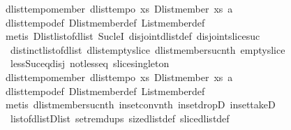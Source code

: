 \begin{isabellebody}
\isanewline
%
\endisadelimproof
\isanewline
{}\isamarkupfalse%
\ dlist{\isacharunderscore}tempo{}{\isacharunderscore}member{\isacharcolon}\ {\isachardoublequoteopen}dlist{\isacharunderscore}tempo{}\ {\isacharparenleft}{\isasymlambda}xs{\isachardot}\ Dlist{\isachardot}member\ xs\ a{\isacharparenright}{\isachardoublequoteclose}\isanewline
%
\isadelimproof
%
\endisadelimproof
%
\isatagproof
{}\isamarkupfalse%
\ dlist{\isacharunderscore}tempo{}{\isacharunderscore}def\ Dlist{\isachardot}member{\isacharunderscore}def\ List{\isachardot}member{\isacharunderscore}def\isanewline
{}\isamarkupfalse%
\ {\isacharparenleft}metis\ Dlist{\isacharunderscore}list{\isacharunderscore}of{\isacharunderscore}dlist\ Suc{\isacharunderscore}leI\ disjoint{\isacharunderscore}dlist{\isacharunderscore}def\ disjoint{\isacharunderscore}slice{\isacharunderscore}suc\ \isanewline
\ \ distinct{\isacharunderscore}list{\isacharunderscore}of{\isacharunderscore}dlist\ dlist{\isacharunderscore}empty{\isacharunderscore}slice\ dlist{\isacharunderscore}member{\isacharunderscore}suc{\isacharunderscore}nth{}\ empty{\isacharunderscore}slice\ \isanewline
\ \ less{\isacharunderscore}Suc{\isacharunderscore}eq{\isacharunderscore}{}{\isacharunderscore}disj\ not{\isacharunderscore}less{\isacharunderscore}eq\ slice{\isacharunderscore}singleton{\isacharparenright}%
\endisatagproof
{\isafoldproof}%
%
\isadelimproof
\isanewline
%
\endisadelimproof
\isanewline
{}\isamarkupfalse%
\ dlist{\isacharunderscore}tempo{}{\isacharunderscore}member{\isacharcolon}\ {\isachardoublequoteopen}dlist{\isacharunderscore}tempo{}\ {\isacharparenleft}{\isasymlambda}xs{\isachardot}\ Dlist{\isachardot}member\ xs\ a{\isacharparenright}{\isachardoublequoteclose}\isanewline
%
\isadelimproof
%
\endisadelimproof
%
\isatagproof
{}\isamarkupfalse%
\ dlist{\isacharunderscore}tempo{}{\isacharunderscore}def\ Dlist{\isachardot}member{\isacharunderscore}def\ List{\isachardot}member{\isacharunderscore}def\isanewline
\isanewline
{}\isamarkupfalse%
\ {\isacharparenleft}metis\ dlist{\isacharunderscore}member{\isacharunderscore}suc{\isacharunderscore}nth\ in{\isacharunderscore}set{\isacharunderscore}conv{\isacharunderscore}nth\ in{\isacharunderscore}set{\isacharunderscore}dropD\ in{\isacharunderscore}set{\isacharunderscore}takeD\ \isanewline
\ \ list{\isacharunderscore}of{\isacharunderscore}dlist{\isacharunderscore}Dlist\ set{\isacharunderscore}remdups\ size{\isacharunderscore}dlist{\isacharunderscore}def\ slice{\isacharunderscore}dlist{\isacharunderscore}def{\isacharparenright}%

\end{isabellebody}
